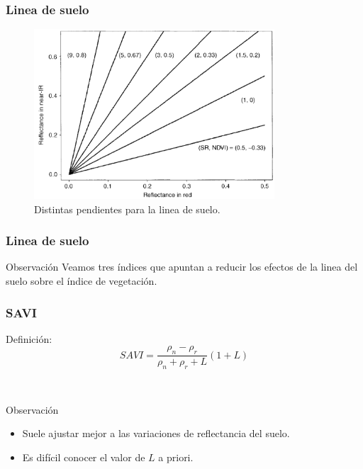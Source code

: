 \documentclass[handout]{beamer}
\begin{document}
\begin{frame}
    \frametitle{Linea de suelo}
    \begin{figure}
    \begin{center}
        \includegraphics[width=0.8\textwidth]{imagenes/soiline.png}
    \end{center}
        \caption{Distintas pendientes para la linea de
        suelo.}
    \end{figure}
\end{frame}

\begin{frame}
    \frametitle{Linea de suelo}
    \begin{block}{Observación}
        Veamos tres índices que apuntan a reducir los efectos de la linea del
        suelo sobre el índice de vegetación.
    \end{block}
\end{frame}

\begin{frame}
    \frametitle{SAVI}
    \begin{block}{Definición:}
        \begin{equation}
            SAVI = \frac{\rho_n-\rho_r}{\rho_n+\rho_r+L}(1+L)
        \end{equation}
    \end{block}\pause\
    \begin{block}{Observación}
        \begin{itemize}[<+->]
            \item Suele ajustar mejor a las variaciones de reflectancia del
                suelo.
            \item Es difícil conocer el valor de $L$ a priori.
        \end{itemize}
    \end{block}
\end{frame}
\end{document}
